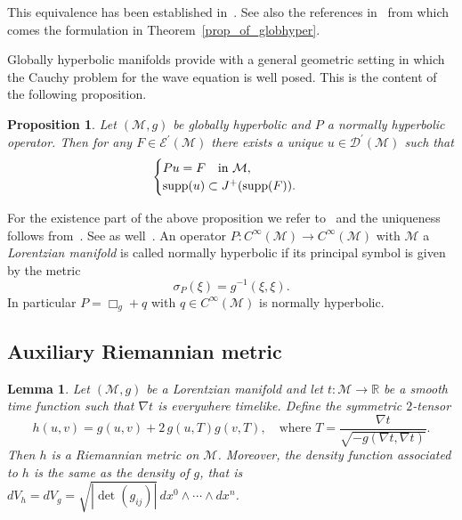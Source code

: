 \documentclass[12pt,reqno]{amsart}
\numberwithin{equation}{section}
\newcommand{\bg}{\Box_{g}}
\theoremstyle{definition}
\theoremstyle{plain}
\newtheorem{lemma}[theorem]{Lemma}
\newtheorem{proposition}[theorem]{Proposition}
\theoremstyle{definition}
\theoremstyle{definition}
\newcommand{\M}{\mathcal{M}}
\DeclareMathOperator{\supp}{supp}
\begin{document}
This equivalence has been established in~\cite{bernal2003, bernal2005}. See also the references in~\cite[Proposition 2.3]{oksanen2024rigiditylorentziancalderonproblem} from which comes the formulation in Theorem~\ref{prop_of_globhyper}.

\medskip

Globally hyperbolic manifolds provide with a general geometric setting in which the Cauchy problem for the wave equation is well posed. This is the content of the following proposition.
\begin{proposition}
\label{prop_wave_lorentz}
  Let $(\M, g)$ be globally hyperbolic and $P$ a normally hyperbolic operator. Then for any $F \in \mathcal{E}^\prime(\M)$ there exists a unique $u \in \mathcal{D}^\prime (\M)$ such that
 \begin{equation}
\begin{cases}
    P u=F  \quad \textnormal{in } \M,\\
    \supp (u) \subset J^+(\supp (F)).
    \end{cases}
\end{equation}
\end{proposition}
For the existence part of the above proposition we refer to~\cite[Theorem 3.3.1]{bar2007} and the uniqueness follows from~\cite[Theorem 3.1.1]{bar2007}. See as well~\cite[Theorem 6.3.1]{friedlander1976wave}. An operator $P: C^\infty(\M) \to C^\infty(\M) $ with $\M$ a \textit{Lorentzian manifold} is called normally hyperbolic if its principal symbol is given by the metric
\begin{equation}
    \sigma_P(\xi)=g^{-1}(\xi,\xi).
\end{equation}
In particular $P=\bg+q$ with $q \in C^\infty(\M)$ is normally hyperbolic.




\subsection{Auxiliary Riemannian metric}

\begin{lemma}
\label{lem_aux_riem_metric}
Let $(\M,g)$ be a Lorentzian manifold and let $t : \M \to \mathbb{R}$ be a smooth time function such that $\nabla t$ is everywhere timelike.
Define the symmetric $2$-tensor
\[
h(u,v) = g(u,v) + 2\, g(u, T) g(v, T),
\quad \text{where } T = \frac{\nabla t}{\sqrt{-g(\nabla t,\nabla t)}}.
\]
Then $h$ is a Riemannian metric on $\M$. Moreover, the density function associated to $h$ is the same as the density of $g$, that is $d V_h=d V_g=\sqrt{|\det(g_{ij})|}\, dx^0 \wedge \cdots \wedge dx^n$.
\end{lemma}
\end{document}
